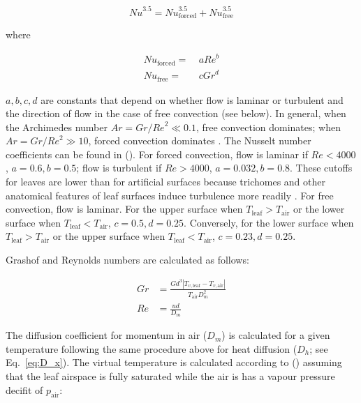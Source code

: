 \documentclass[11pt, oneside]{article}
\begin{document}
\begin{equation}
  \label{eq:nusselt}
  \mathit{Nu} ^ {3.5} = \mathit{Nu}_\mathrm{forced} ^ {3.5} + \mathit{Nu}_\mathrm{free} ^ {3.5}
\end{equation}

where

\begin{align}
  \mathit{Nu}_\mathrm{forced} =  & ~ a \mathit{Re} ^ b \\
  \mathit{Nu}_\mathrm{free} =    & ~ c \mathit{Gr} ^ d
\end{align}

$a, b, c, d$ are constants that depend on whether flow is laminar or turbulent and the direction of flow in the case of free convection (see below). In general, when the Archimedes number $\mathit{Ar} = \mathit{Gr} / \mathit{Re} ^ 2 \ll 0.1$, free convection dominates; when $\mathit{Ar} = \mathit{Gr} / \mathit{Re} ^ 2 \gg 10$, forced convection dominates \citep{Nobel_2009}. The Nusselt number coefficients can be found in \citeauthor{Monteith_Unsworth_2013} (\citeyear{Monteith_Unsworth_2013}). For forced convection, flow is laminar if $\mathit{Re} < 4000$, $a = 0.6, b = 0.5$; flow is turbulent if $\mathit{Re} > 4000$, $a = 0.032, b = 0.8$. These cutoffs for leaves are lower than for artificial surfaces because trichomes and other anatomical features of leaf surfaces induce turbulence more readily \citep{Grace_Wilson_1976}. For free convection, flow is laminar. For the upper surface when $T_\mathrm{leaf} > T_\mathrm{air}$ or the lower surface when $T_\mathrm{leaf} < T_\mathrm{air}$, $c = 0.5, d = 0.25$. Conversely, for the lower surface when $T_\mathrm{leaf} > T_\mathrm{air}$ or the upper surface when $T_\mathrm{leaf} < T_\mathrm{air}$, $c = 0.23, d = 0.25$.

Grashof and Reynolds numbers are calculated as follows:

\begin{align}
  \mathit{Gr} & = \frac{G d ^ 3 |T_{v,\mathrm{leaf}} - T_{v,\mathrm{air}}|}{T_\mathrm{air} D_m ^ 2} \\
  \mathit{Re} & = \frac{u d}{D_m}
\end{align}

The diffusion coefficient for momentum in air ($D_m$) is calculated for a given temperature following the same procedure above for heat diffusion ($D_h$; see Eq.~\ref{eq:D_x}). The virtual temperature is calculated according to \citeauthor{Monteith_Unsworth_2013} (\citeyear{Monteith_Unsworth_2013}) assuming that the leaf airspace is fully saturated while the air is has a vapour pressure decifit of $p_\mathrm{air}$:
\end{document}
